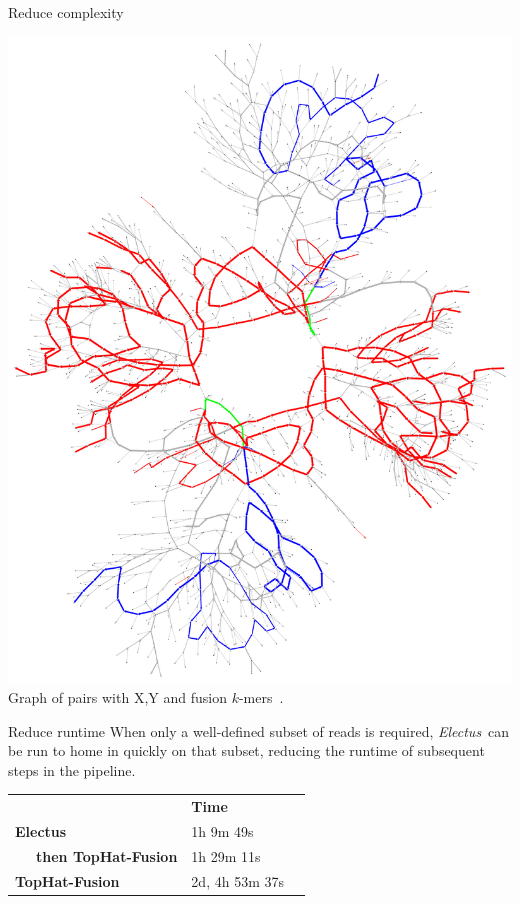 \documentclass[a0paper,portrait]{baposter}
\newcommand{\kmers}{$k$-mers\ }
\newcommand{\Electus}{\textit{Electus}\ }
\begin{document}
\begin{poster}
\begin{posterbox}[name=graphs,column=1,row=0]{Reduce complexity}
\vspace{1.0em}
\begin{center}
\includegraphics[width=0.9\linewidth]{sub-t1-r15lp}
\footnotesize
Graph of pairs with \textcolor{graphblue}{X},\textcolor{graphred}{Y} and \textcolor{graphgreen}{fusion} \kmers.
\end{center}

\end{posterbox}

\begin{posterbox}[name=runtime,column=1,below=graphs]{Reduce runtime}
When only a well-defined subset of reads is required, \Electus can be run to home in quickly 
on that subset, reducing the runtime of subsequent steps in the pipeline.

\vspace{-0.5em}

\begin{center}
\begin{tabular}[]{lll}
            & \bf{Time} \\
\bf{Electus}     &  1h 9m 49s \\
~~~\bf{then TopHat-Fusion} & 1h 29m 11s \\
\bf{TopHat-Fusion} & 2d, 4h 53m 37s \\
\end{tabular}


\end{center}
\end{posterbox}
\end{poster}
\end{document}
